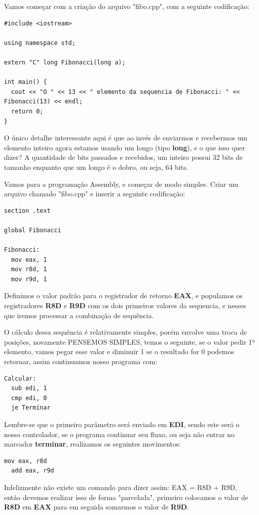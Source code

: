 Vamos começar com a criação do arquivo "fibo.cpp", com a seguinte codificação:
\begin{lstlisting}[]
#include <iostream>

using namespace std;

extern "C" long Fibonacci(long a);

int main() {
  cout << "O " << 13 << " elemento da sequencia de Fibonacci: " << Fibonacci(13) << endl;
  return 0;
}	
\end{lstlisting}

O único detalhe interessante aqui é que ao invés de enviarmos e recebermos um elemento inteiro agora estamos usando um longo (tipo \textbf{long}), e o que isso quer dizer? A quantidade de bits passados e recebidos, um inteiro possui 32 bits de tamanho enquanto que um longo é o dobro, ou seja, 64 bits.

Vamos para a programação Assembly, e começar de modo simples. Criar um arquivo chamado "fibo.cpp" e inserir a seguinte codificação:
\begin{lstlisting}[]
section .text

global Fibonacci

Fibonacci:
  mov eax, 1
  mov r8d, 1
  mov r9d, 1
\end{lstlisting}

Definimos o valor padrão para o registrador de retorno \textbf{EAX}, e populamos os registradores \textbf{R8D} e \textbf{R9D} com os dois primeiros valores da sequencia, e nesses que iremos processar a combinação de sequência.

O cálculo dessa sequência é relativamente simples, porém envolve uma troca de posições, novamente PENSEMOS SIMPLES, temos o seguinte, se o valor pedir 1º elemento, vamos pegar esse valor e diminuir 1 se o resultado for 0 podemos retornar, assim continuamos nosso programa com:
\begin{lstlisting}[]
Calcular:
  sub edi, 1 
  cmp edi, 0
  je Terminar
\end{lstlisting}

Lembre-se que o primeiro parâmetro será enviado em \textbf{EDI}, sendo este será o nosso controlador, se o programa continuar seu fluxo, ou seja não entrar no marcador \textbf{terminar}, realizamos os seguintes movimentos:
\begin{lstlisting}[]
  mov eax, r8d
  add eax, r9d
\end{lstlisting}

Infelizmente não existe um comando para dizer assim: {\ttfamily EAX = R8D + R9D}, então devemos realizar isso de forma "parcelada", primeiro colocamos o valor de \textbf{R8D} em \textbf{EAX} para em seguida somarmos o valor de \textbf{R9D}.

